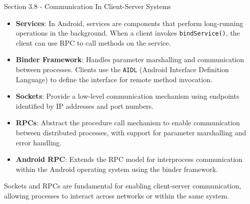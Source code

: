 \begin{notes}{Section 3.8 - Communication In Client-Server Systems}
\begin{highlight}
        \begin{itemize}
            \item \textbf{Services}: In Android, services are components that perform long-running operations in the background. When a client invokes \texttt{bindService()}, the client can use RPC to 
            call methods on the service.
            \item \textbf{Binder Framework}: Handles parameter marshalling and communication between processes. Clients use the \texttt{AIDL} (Android Interface Definition Language) to define the interface 
            for remote method invocation.
        \end{itemize}
    
    \end{highlight}
    
    \begin{highlight}
    
        \begin{itemize}
            \item \textbf{Sockets}: Provide a low-level communication mechanism using endpoints identified by IP addresses and port numbers.
            \item \textbf{RPCs}: Abstract the procedure call mechanism to enable communication between distributed processes, with support for parameter marshalling and error handling.
            \item \textbf{Android RPC}: Extends the RPC model for interprocess communication within the Android operating system using the binder framework.
        \end{itemize}
    
    Sockets and RPCs are fundamental for enabling client-server communication, allowing processes to interact across networks or within the same system.
    
    \end{highlight}
\end{notes}